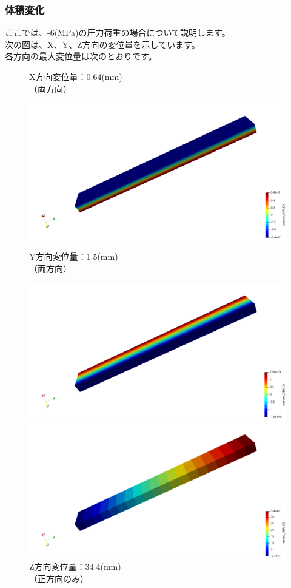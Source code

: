 \subsubsection{体積変化}
ここでは、-6(MPa)の圧力荷重の場合について説明します。\\
次の図は、X、Y、Z方向の変位量を示しています。\\
各方向の最大変位量は次のとおりです。
\begin{figure}[H]
	\begin{minipage}{0.32\hsize}
		\caption{X方向変位量：0.64(mm)\\（両方向）}
		\centering
		\includegraphics[width=0.9\columnwidth]{fig/dispX.png}
	\end{minipage}
	\begin{minipage}{0.32\hsize}
		\caption{Y方向変位量：1.5(mm)\\（両方向）}
		\centering
		\includegraphics[width=0.9\columnwidth]{fig/dispY.png}
	\end{minipage}
	\begin{minipage}{0.32\hsize}
		\caption{Z方向変位量：34.4(mm)\\（正方向のみ）}
		\centering
		\includegraphics[width=0.9\columnwidth]{fig/dispZ.png}
	\end{minipage}
\end{figure}
